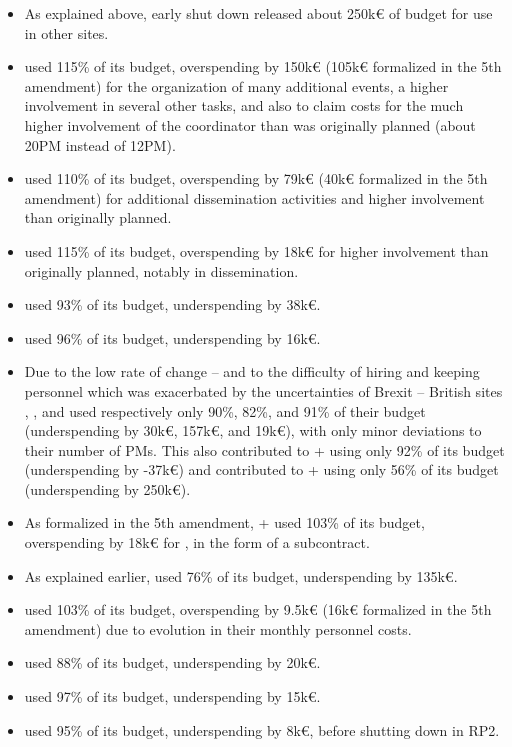 \begin{itemize}
\item As explained above,  early shut down released about
  250k€ of budget for use in other sites.
\item {} used 115\% of its budget, overspending by 150k€ (105k€
  formalized in the 5th amendment) for the organization of many
  additional events, a higher involvement in several other tasks, and
  also to claim costs for the much higher involvement of the
  coordinator than was originally planned (about 20PM instead of
  12PM).
\item {} used 110\% of its budget, overspending by 79k€ (40k€
  formalized in the 5th amendment) for additional dissemination
  activities and higher involvement than originally planned.
\item {} used 115\% of its budget, overspending by 18k€ for
  higher involvement than originally planned, notably in
  dissemination.
\item {} used 93\% of its budget, underspending by 38k€.
\item {} used 96\% of its budget, underspending by 16k€.
\item Due to the low rate of change -- and to the difficulty of hiring
  and keeping personnel which was exacerbated by the uncertainties of
  Brexit -- British sites , , and  used
  respectively only 90\%, 82\%, and 91\% of their budget
  (underspending by 30k€, 157k€, and 19k€), with only minor deviations
  to their number of PMs. This also contributed to
  + using only 92\% of its budget (underspending
  by -37k€) and contributed to + using only 56\%
  of its budget (underspending by 250k€).
\item As formalized in the 5th amendment, + used
  103\% of its budget, overspending by 18k€ for
  , in the form of a subcontract.
\item As explained earlier,  used 76\% of its budget,
  underspending by 135k€.
\item {} used 103\% of its budget, overspending by 9.5k€ (16k€
  formalized in the 5th amendment) due to evolution in their monthly
  personnel costs.
\item {} used 88\% of its budget, underspending by 20k€.
\item {} used 97\% of its budget, underspending by 15k€.
\item {} used 95\% of its budget, underspending by 8k€, before
  shutting down in RP2.
\end{itemize}

